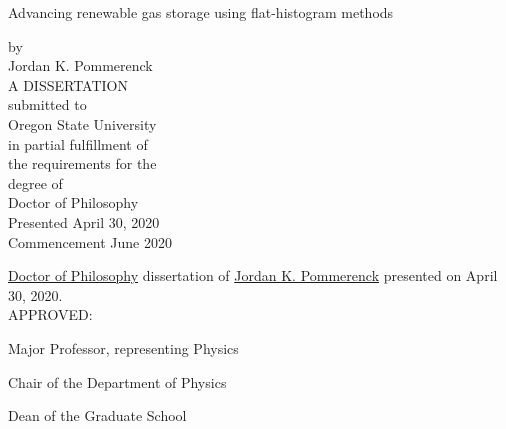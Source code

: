 \newpage{}
\thispagestyle{empty}
\singlespacing

\begin{center}
Advancing renewable gas storage using flat-histogram methods

\vspace{1.0cm}
by \\
Jordan K. Pommerenck \\
\vspace{3.0cm}
A DISSERTATION \\
\vspace{0.5cm}
submitted to \\
\vspace{0.5cm}
Oregon State University \\
\vspace{3.0cm}
in partial fulfillment of \\
the requirements for the \\
degree of \\
\vspace{1.0cm}
Doctor of Philosophy \\
\vspace{3.0cm}
Presented April 30, 2020  \\
Commencement June 2020
\end{center}

\newpage{}
\thispagestyle{empty}
\singlespacing
\justify{}
\underline{Doctor of Philosophy} dissertation of \underline{Jordan K. Pommerenck} presented on
April 30, 2020. \\

\justify{}
\vspace{0.5cm}
APPROVED: \\

\justify{}
\underline{\hspace{15cm}}
\begin{flushleft}
Major Professor, representing Physics
\vspace{1.0cm}
\end{flushleft}

\justify{}
\underline{\hspace{15cm}}
\begin{flushleft}
Chair of the Department of Physics
\vspace{1.0cm}
\end{flushleft}

\justify{}
\underline{\hspace{15cm}}
\begin{flushleft}
Dean of the Graduate School
\vspace{1.0cm}
\end{flushleft}


